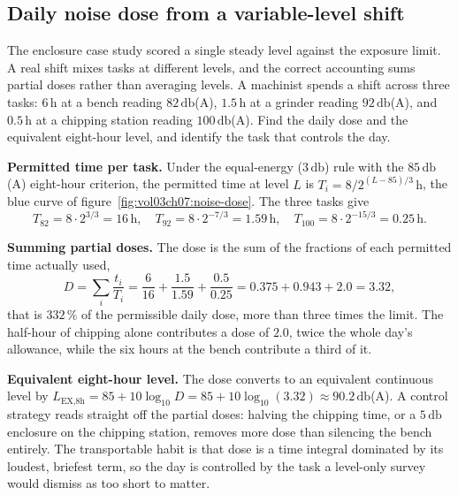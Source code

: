 

\subsection{Daily noise dose from a variable-level shift}

The enclosure case study scored a single steady level against the exposure
limit. A real shift mixes tasks at different levels, and the correct
accounting sums partial doses rather than averaging levels. A machinist
spends a shift across three tasks: $6\,\si{\hour}$ at a bench reading
$82\,\si{\decibel}$(A), $1.5\,\si{\hour}$ at a grinder reading
$92\,\si{\decibel}$(A), and $0.5\,\si{\hour}$ at a chipping station reading
$100\,\si{\decibel}$(A). Find the daily dose and the equivalent eight-hour
level, and identify the task that controls the day.

\textbf{Permitted time per task.} Under the equal-energy ($3\,\si{\decibel}$)
rule with the $85\,\si{\decibel}$(A) eight-hour criterion, the permitted
time at level $L$ is $T_i = 8/2^{(L-85)/3}\,\si{\hour}$, the blue curve of
figure~\ref{fig:vol03ch07:noise-dose}. The three tasks give
\[
T_{82} = 8\cdot 2^{3/3} = 16\,\si{\hour},\quad
T_{92} = 8\cdot 2^{-7/3} = 1.59\,\si{\hour},\quad
T_{100} = 8\cdot 2^{-15/3} = 0.25\,\si{\hour}.
\]

\textbf{Summing partial doses.} The dose is the sum of the fractions of each
permitted time actually used,
\[
D = \sum_i \frac{t_i}{T_i}
  = \frac{6}{16} + \frac{1.5}{1.59} + \frac{0.5}{0.25}
  = 0.375 + 0.943 + 2.0 = 3.32 ,
\]
that is $332\,\%$ of the permissible daily dose, more than three times the
limit. The half-hour of chipping alone contributes a dose of $2.0$, twice
the whole day's allowance, while the six hours at the bench contribute a
third of it.

\textbf{Equivalent eight-hour level.} The dose converts to an equivalent
continuous level by $L_{\text{EX,8h}} = 85 + 10\log_{10}D = 85 +
10\log_{10}(3.32) \approx 90.2\,\si{\decibel}$(A). A control strategy reads
straight off the partial doses: halving the chipping time, or a
$5\,\si{\decibel}$ enclosure on the chipping station, removes more dose than
silencing the bench entirely. The transportable habit is that dose is a
time integral dominated by its loudest, briefest term, so the day is
controlled by the task a level-only survey would dismiss as too short to
matter.



